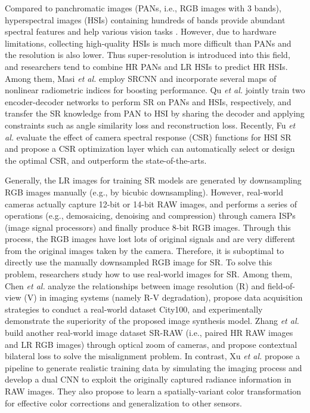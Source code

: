 {Compared to panchromatic images (PANs, i.e., RGB images with 3 bands), hyperspectral images (HSIs) containing hundreds of bands provide abundant spectral features and help various vision tasks . 
However, due to hardware limitations, collecting high-quality HSIs is much more difficult than PANs and the resolution is also lower.
Thus super-resolution is introduced into this field, and researchers tend to combine HR PANs and LR HSIs to predict HR HSIs.
Among them, Masi \textit{et al.}  employ SRCNN  and incorporate several maps of nonlinear radiometric indices for boosting performance.
Qu \textit{et al.}  jointly train two encoder-decoder networks to perform SR on PANs and HSIs, respectively, and transfer the SR knowledge from PAN to HSI by sharing the decoder and applying constraints such as angle similarity loss and reconstruction loss.
Recently, Fu \textit{et al.}  evaluate the effect of camera spectral response (CSR) functions for HSI SR and propose a CSR optimization layer which can automatically select or design the optimal CSR, and outperform the state-of-the-arts.

Generally, the LR images for training SR models are generated by downsampling RGB images manually (e.g., by bicubic downsampling).
However, real-world cameras actually capture 12-bit or 14-bit RAW images, and performs a series of operations (e.g., demosaicing, denoising and compression) through camera ISPs (image signal processors) and finally produce 8-bit RGB images.
Through this process, the RGB images have lost lots of original signals and are very different from the original images taken by the camera.
Therefore, it is suboptimal to directly use the manually downsampled RGB image for SR.
To solve this problem, researchers study how to use real-world images for SR.
Among them, Chen \textit{et al.}  analyze the relationships between image resolution (R) and field-of-view (V) in imaging systems (namely R-V degradation), propose data acquisition strategies to conduct a real-world dataset City100, and experimentally demonstrate the superiority of the proposed image synthesis model.
Zhang \textit{et al.}  build another real-world image dataset SR-RAW (i.e., paired HR RAW images and LR RGB images) through optical zoom of cameras, and propose contextual bilateral loss to solve the misalignment problem.  
In contrast, Xu \textit{et al.}  propose a pipeline to generate realistic training data by simulating the imaging process and develop a dual CNN to exploit the originally captured radiance information in RAW images.
They also propose to learn a spatially-variant color transformation for effective color corrections and generalization to other sensors.

}
